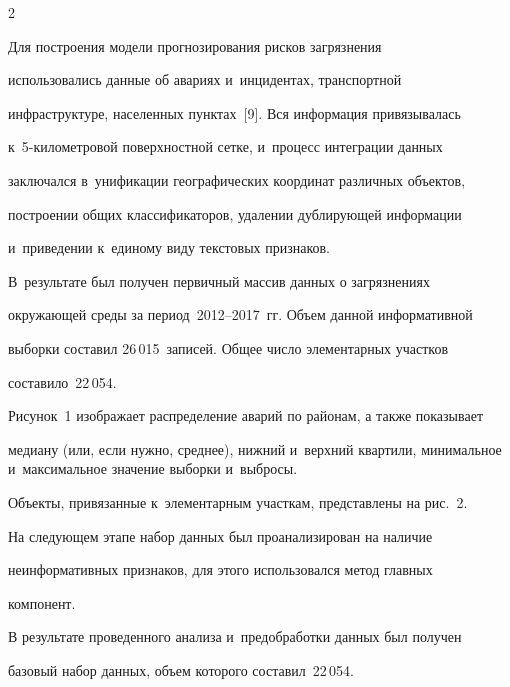 \begin{multicols}{2}
  


  Для построения модели прогнозирования рисков загрязнения 


использовались данные об авариях и~инцидентах, транспортной 


инфраструктуре, населенных пунктах~[9]. Вся информация привязывалась  


к~5-ки\-ло\-мет\-ро\-вой поверхностной сетке, и~процесс интеграции данных 


заключался в~унификации географических координат различных объектов, 


построении общих классификаторов, удалении дублирующей информации 


и~приведении к~единому виду текстовых признаков.


  


  В~результате был получен первичный массив данных о загрязнениях 


окружающей среды за период~2012--2017~гг. Объем данной информативной 


выборки составил 26\,015~записей. Общее число элементарных участков 


составило~22\,054. 


  


  Рисунок~1 изображает распределение аварий по районам, а также показывает 


медиану (или, если нужно, среднее), нижний и~верхний квартили, минимальное и~максимальное значение выборки и~выбросы.








  Объекты, привязанные к~элементарным участкам, представлены на рис.~2. 


  





  


  На следующем этапе набор данных был проанализирован на наличие 


неинформативных признаков, для этого использовался метод главных 


компонент.


  


  В результате проведенного анализа и~предобработки данных был получен 


базовый набор данных, объем которого составил~22\,054.



\end{multicols}
